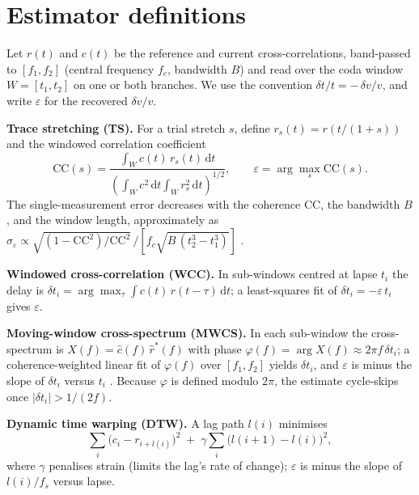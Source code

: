 \documentclass[
  11pt,
  letterpaper,
]{article}
\providecommand{\dvv}{\ensuremath{\delta v/v}}
\begin{document}
\appendix

\section{Estimator definitions}\label{app:estimators}

Let \(r(t)\) and \(c(t)\) be the reference and current
cross-correlations, band-passed to \([f_1,f_2]\) (central frequency
\(f_c\), bandwidth \(B\)) and read over the coda window \(W=[t_1,t_2]\)
on one or both branches. We use the convention \(\delta t/t = -\,\dvv\),
and write \(\varepsilon\) for the recovered \dvv.

\textbf{Trace stretching (TS).} For a trial stretch \(s\), define
\(r_s(t)=r\!\left(t/(1+s)\right)\) and the windowed correlation
coefficient \begin{equation}
\mathrm{CC}(s) = \frac{\int_W c(t)\,r_s(t)\,\mathrm{d}t}
{\left(\int_W c^2\,\mathrm{d}t\int_W r_s^2\,\mathrm{d}t\right)^{1/2}},
\qquad \varepsilon = \arg\max_s \mathrm{CC}(s).
\end{equation} The single-measurement error decreases with the coherence
\(\mathrm{CC}\), the bandwidth \(B\), and the window length,
approximately as \(\sigma_{\varepsilon} \propto
\sqrt{(1-\mathrm{CC}^2)/\mathrm{CC}^2}\, \big/\!\left[f_c\sqrt{B\,(t_2^3-t_1^3)}\right]\)
\citep{Weaver2011}.

\textbf{Windowed cross-correlation (WCC).} In sub-windows centred at
lapse \(t_i\) the delay is
\(\delta t_i=\arg\max_{\tau}\int c(t)\,r(t-\tau)\,\mathrm{d}t\); a
least-squares fit of \(\delta t_i=-\varepsilon\,t_i\) gives
\(\varepsilon\).

\textbf{Moving-window cross-spectrum (MWCS).} In each sub-window the
cross-spectrum is \(X(f)=\hat c(f)\,\hat r^{*}(f)\) with phase
\(\varphi(f)=\arg X(f)\approx 2\pi
f\,\delta t_i\); a coherence-weighted linear fit of \(\varphi(f)\) over
\([f_1,f_2]\) yields \(\delta t_i\), and \(\varepsilon\) is minus the
slope of \(\delta t_i\) versus \(t_i\) \citep{Clarke2011}. Because
\(\varphi\) is defined modulo \(2\pi\), the estimate cycle-skips once
\(|\delta t_i|>1/(2f)\).

\textbf{Dynamic time warping (DTW).} A lag path \(l(i)\) minimises
\begin{equation}
\sum_i \big(c_i - r_{i+l(i)}\big)^2 \;+\; \gamma\sum_i \big(l(i{+}1)-l(i)\big)^2,
\end{equation} where \(\gamma\) penalises strain (limits the lag's rate
of change); \(\varepsilon\) is minus the slope of \(l(i)/f_s\) versus
lapse.
\end{document}
